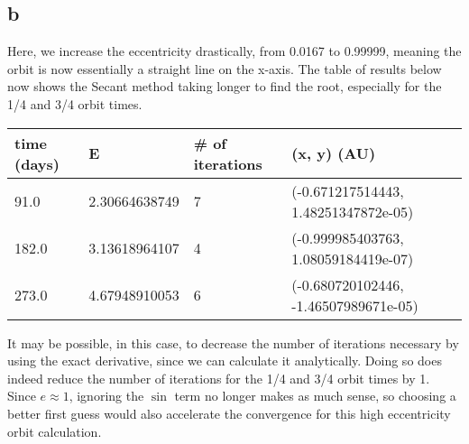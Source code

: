 \documentclass[11pt,letterpaper]{article}
\begin{document}
\subsection*{b}

Here, we increase the eccentricity drastically, from 0.0167 to 0.99999,
meaning the orbit is now essentially a straight line on the x-axis. The
table of results below now shows the Secant method taking longer to find the 
root, especially for the 1/4 and 3/4 orbit times. 

\begin{center}
    \begin{tabular}{| l | l | l | l |}
    \hline
    time (days) & E & \# of iterations & (x, y) (AU)\\ \hline
    91.0 & 2.30664638749 & 7 & (-0.671217514443, 1.48251347872e-05) \\ \hline
    182.0 & 3.13618964107 & 4 & (-0.999985403763, 1.08059184419e-07) \\ \hline
    273.0 & 4.67948910053 & 6 & (-0.680720102446, -1.46507989671e-05) \\
    \hline
    \end{tabular}
\end{center}

It may be possible, in this case, to decrease the number of iterations 
necessary by using the exact derivative, since we can calculate it 
analytically. Doing so does indeed reduce the number of iterations 
for the 1/4 and 3/4 orbit times by 1. Since $e \approx 1$, ignoring the 
$\sin$ term no longer makes as much sense, so choosing a better first
guess would also accelerate the convergence for this high eccentricity 
orbit calculation.
\end{document}
